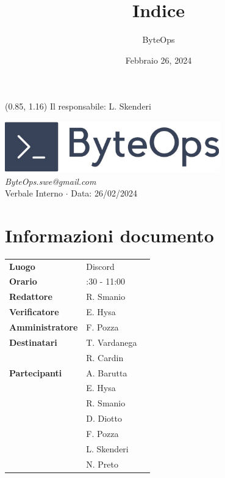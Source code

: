 \documentclass{article}
\title{\textbf{\fontsize{28}{6}\selectfont Indice}}
\author{\fontsize{14}{6}\selectfont ByteOps}
\date{Febbraio 26, 2024}
\begin{document}
\begin{textblock*}{\textwidth}(0.85\textwidth, 1.16\textheight)
    Il responsabile: L. Skenderi
\end{textblock*}

\pagestyle{fancy}
\begin{center}
\includegraphics[width = 0.7\textwidth]{../../Images/logo.png} \\
\vspace{0.2cm}
\textcolor[RGB]{60, 60, 60}{\textit{ByteOps.swe@gmail.com}} \\
\vspace{1cm}
\fontsize{16}{6}\selectfont Verbale Interno $\cdot$ Data: 26/02/2024 \\
\vspace{0.5cm}
\end{center}

\section*{Informazioni documento}
\def\arraystretch{1.2}
\begin{tabular}{>{\raggedleft\arraybackslash}p{}|>{\raggedright\arraybackslash}p{}c}
\hline
\addlinespace
\textbf{Luogo} & Discord \vspace{10pt} \\
\textbf{Orario} & 09:30 - 11:00 \vspace{10pt} \\
\textbf{Redattore} & R. Smanio \vspace{10pt} \\
\textbf{Verificatore} & E. Hysa \vspace{10pt} \\
\textbf{Amministratore} & F. Pozza \vspace{10pt} \\
\textbf{Destinatari} & T. Vardanega \\ & R. Cardin \vspace{10pt} \\
\textbf{Partecipanti} & A. Barutta \\ & E. Hysa \\ & R. Smanio \\ & D. Diotto \\ & F. Pozza \\ & L. Skenderi \\ & N. Preto \vspace{10pt} \\
\end{tabular}
\pagebreak 
\end{document}
